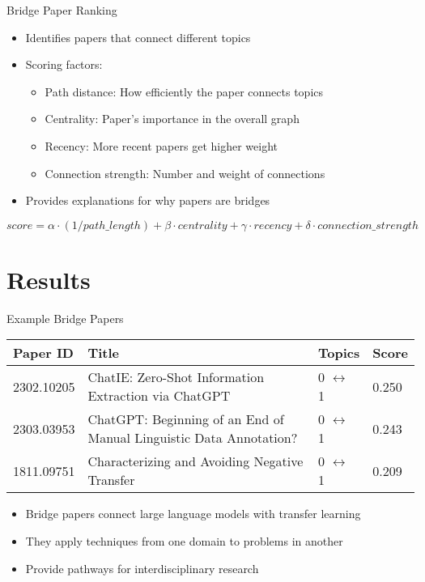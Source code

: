 \documentclass{beamer}
\begin{document}
\begin{frame}{Bridge Paper Ranking}
    \begin{itemize}
        \item Identifies papers that connect different topics
        \item Scoring factors:
        \begin{itemize}
            \item Path distance: How efficiently the paper connects topics
            \item Centrality: Paper's importance in the overall graph
            \item Recency: More recent papers get higher weight
            \item Connection strength: Number and weight of connections
        \end{itemize}
        \item Provides explanations for why papers are bridges
    \end{itemize}
    
    \begin{equation*}
    score = \alpha \cdot (1/path\_length) + \beta \cdot centrality + \gamma \cdot recency + \delta \cdot connection\_strength
    \end{equation*}
\end{frame}

\section{Results}

\begin{frame}{Example Bridge Papers}
    \begin{table}
    \centering
    \small
    \begin{tabular}{p{1.8cm}p{5.5cm}p{1.2cm}p{1cm}}
    \hline
    \textbf{Paper ID} & \textbf{Title} & \textbf{Topics} & \textbf{Score} \\
    \hline
    2302.10205 & ChatIE: Zero-Shot Information Extraction via ChatGPT & 0 $\leftrightarrow$ 1 & 0.250 \\
    2303.03953 & ChatGPT: Beginning of an End of Manual Linguistic Data Annotation? & 0 $\leftrightarrow$ 1 & 0.243 \\
    1811.09751 & Characterizing and Avoiding Negative Transfer & 0 $\leftrightarrow$ 1 & 0.209 \\
    \hline
    \end{tabular}
    \end{table}
    
    \vspace{0.3cm}
    \begin{itemize}
        \item Bridge papers connect large language models with transfer learning
        \item They apply techniques from one domain to problems in another
        \item Provide pathways for interdisciplinary research
    \end{itemize}
\end{frame}
\end{document}
